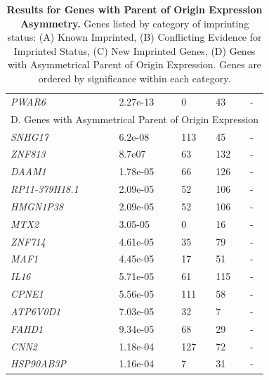 \begin{table}
\begin{adjustbox}{width={\textwidth}}
\begin{tabular}{@{}p{3cm}|p{2cm}p{5cm}p{5cm}p{6cm}@{}}
 \emph{PWAR6} & 2.27e-13 & 0 & 43 & - \\
 \multicolumn{5}{c}{D. Genes with Asymmetrical Parent of Origin Expression}  \\ \hline
 \emph{SNHG17} & 6.2e-08 & 113 & 45 & - \\
 \emph{ZNF813} & 8.7e07 & 63 & 132 & - \\
 \emph{DAAM1} & 1.78e-05 & 66 & 126 & -\\
 \emph{RP11-379H18.1} & 2.09e-05 & 52 & 106 & - \\
 \emph{HMGN1P38} & 2.09e-05 & 52 & 106 & - \\
 \emph{MTX2} & 3.05-05 & 0 & 16 & - \\
\emph{ZNF714} & 4.61e-05 & 35 & 79 & - \\
\emph{MAF1} & 4.45e-05 & 17 & 51 & - \\
\emph{IL16} & 5.71e-05 & 61 & 115 & - \\
\emph{CPNE1} & 5.56e-05 & 111 & 58 & - \\
\emph{ATP6V0D1} & 7.03e-05 & 32 & 7  & - \\
\emph{FAHD1} & 9.34e-05 & 68 & 29 & - \\
\emph{CNN2} & 1.18e-04 & 127 & 72 & -\\
\emph{HSP90AB3P} & 1.16e-04 & 7 & 31 & - \\ \bottomrule
\end{tabular}
\end{adjustbox}
\caption[Results for Genes with Parent of Origin Expression Asymmetry. ]{\textbf{Results for Genes with Parent of Origin Expression Asymmetry. }
Genes listed by category of imprinting status: (A) Known Imprinted, (B) Conflicting Evidence for Imprinted Status, (C) New Imprinted Genes, (D) Genes with Asymmetrical Parent of Origin Expression. Genes are ordered by significance within each category.}
\label{tab:imprintedgenes}
\end{table}




